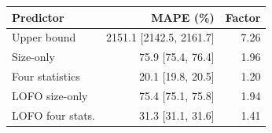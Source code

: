 \begin{tabular}{lrr}
\toprule
Predictor & MAPE (\%) & Factor\\
\midrule
Upper bound & 2151.1 [2142.5, 2161.7] & 7.26 \\
Size-only & 75.9 [75.4, 76.4] & 1.96 \\
Four statistics & 20.1 [19.8, 20.5] & 1.20 \\
LOFO size-only & 75.4 [75.1, 75.8] & 1.94 \\
LOFO four stats. & 31.3 [31.1, 31.6] & 1.41 \\
\bottomrule
\end{tabular}
